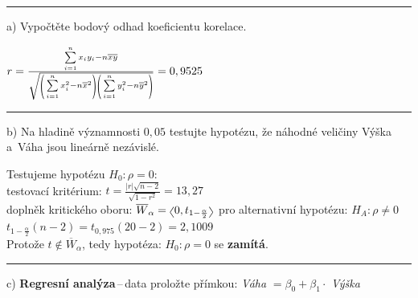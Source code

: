 \documentclass[a4paper, 11pt]{article}
\newcommand{\intlr}[1]{\scaleleftright[1ex]{<}{#1}{>}}
\newcommand{\intopen}[1]{\scaleleftright[1ex]{(}{#1}{)}}
\begin{document}
	\vspace{1em}\noindent\rule{\textwidth}{.5pt}\vspace{1em}

	a) Vypočtěte bodový odhad koeficientu korelace.
	\vspace{1em}

	$ r = \frac{\sum\limits_{i = 1}^n x_i y_i - n \overline{x} \overline{y}}{
	\sqrt{\intopen{\sum\limits_{i = 1}^n x_i^2 - n \overline{x}^2}
	\intopen{\sum\limits_{i = 1}^n y_i^2 - n \overline{y}^2}}} = 0,9525 $

	\vspace{1em}\noindent\rule{\textwidth}{.5pt}\vspace{1em}

	b) Na hladině významnosti $ 0,05 $ testujte hypotézu, že náhodné
	veličiny Výška a~Váha jsou lineárně nezávislé.
	\vspace{1em}

	Testujeme hypotézu $ H_0 : \rho = 0 $: \\
	testovací kritérium: $ t = \frac{|r| \sqrt{n - 2}}{\sqrt{1 - r^2}} =
	13,27 $ \\
	doplněk kritického oboru: $ \overline{W}_\alpha = \intlr{0,
	t_{1 - \frac{\alpha}{2}}} $ pro alternativní hypotézu: $ H_A :
	\rho \neq 0 $ \\
	$ t_{1 - \frac{\alpha}{2}}(n - 2) = t_{0,975}(20 - 2) = 2,1009 $ \\
	Protože $ t \notin \overline{W}_\alpha $, tedy hypotéza: $ H_0 :
	\rho = 0 $ se \textbf{zamítá}.

	\vspace{1em}\noindent\rule{\textwidth}{.5pt}\vspace{1em}

	c) \textbf{Regresní analýza}\,--\,data proložte přímkou: \textit{Váha}
	$ = \beta_0 + \beta_1 \cdot $ \textit{Výška}
	\vspace{1em}
\end{document}
